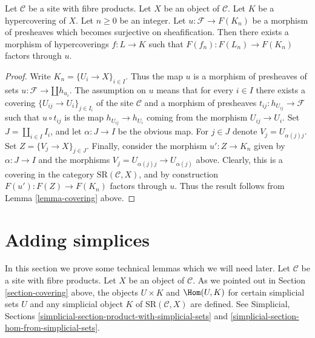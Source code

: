 \begin{lemma}
\label{lemma-covering-sheaf}
Let $\mathcal{C}$ be a site with fibre products.
Let $X$ be an object of $\mathcal{C}$.
Let $K$ be a hypercovering of $X$.
Let $n \geq 0$ be an integer.
Let $u : \mathcal{F} \to F(K_n)$ be a morphism
of presheaves which becomes surjective
on sheafification.
Then there exists a morphism of hypercoverings
$f: L \to K$ such that $F(f_n) : F(L_n) \to F(K_n)$
factors through $u$.
\end{lemma}

\begin{proof}
Write $K_n = \{U_i \to X\}_{i \in I}$.
Thus the map $u$ is a morphism of presheaves of sets
$u : \mathcal{F} \to \amalg h_{u_i}$.
The assumption on $u$ means that for every
$i \in I$ there exists a covering $\{U_{ij} \to U_i\}_{j \in I_i}$
of the site $\mathcal{C}$ and a morphism of presheaves
$t_{ij} : h_{U_{ij}} \to \mathcal{F}$ such that
$u \circ t_{ij}$ is the map $h_{U_{ij}} \to h_{U_i}$
coming from the morphism $U_{ij} \to U_i$.
Set $J = \amalg_{i \in I} I_i$, and let
$\alpha : J \to I$ be the obvious map.
For $j \in J$ denote $V_j = U_{\alpha(j)j}$. Set
$Z = \{V_j \to X\}_{j \in J}$.
Finally, consider the morphism
$u' : Z \to K_n$ given by $\alpha : J \to I$
and the morphisms $V_j = U_{\alpha(j)j} \to U_{\alpha(j)}$
above. Clearly, this is a covering in the
category $\text{SR}(\mathcal{C}, X)$, and by
construction $F(u') : F(Z) \to F(K_n)$ factors through $u$.
Thus the result follows from Lemma \ref{lemma-covering} above.
\end{proof}


\section{Adding simplices}
\label{section-adding-simplices}

\noindent
In this section we prove some technical lemmas which we will need later.
Let $\mathcal{C}$ be a site with fibre products.
Let $X$ be an object of $\mathcal{C}$.
As we pointed out in Section \ref{section-covering} above,
the objects $U \times K$ and $\Hom(U, K)$
for certain simplicial sets $U$
and any simplicial object $K$ of $\text{SR}(\mathcal{C}, X)$
are defined. See Simplicial, Sections
\ref{simplicial-section-product-with-simplicial-sets} and
\ref{simplicial-section-hom-from-simplicial-sets}.


